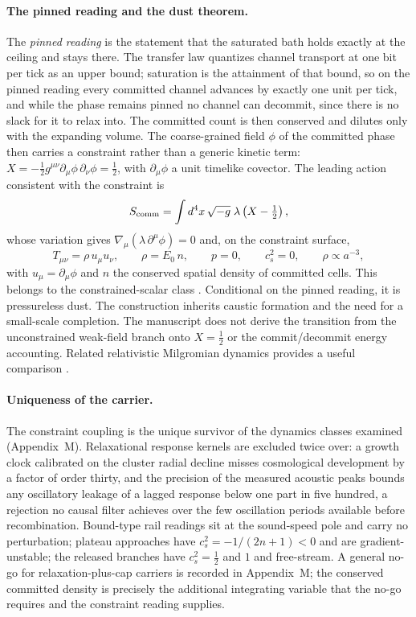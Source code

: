 \documentclass[11pt]{article}
\begin{document}
\paragraph{The pinned reading and the dust theorem.}
The \emph{pinned reading} is the statement that the saturated bath holds exactly at the ceiling and stays there. The transfer law quantizes channel transport at one bit per tick as an upper bound; saturation is the attainment of that bound, so on the pinned reading every committed channel advances by exactly one unit per tick, and while the phase remains pinned no channel can decommit, since there is no slack for it to relax into. The committed count is then conserved and dilutes only with the expanding volume. The coarse-grained field $\phi$ of the committed phase then carries a constraint rather than a generic kinetic term: $X=-\tfrac12 g^{\mu\nu}\partial_\mu\phi\,\partial_\nu\phi=\tfrac12$, with $\partial_\mu\phi$ a unit timelike covector. The leading action consistent with the constraint is
\[
S_{\rm comm}=\int d^4x\,\sqrt{-g}\;\lambda\left(X-\tfrac12\right),
\]
whose variation gives $\nabla_\mu(\lambda\,\partial^\mu\phi)=0$ and, on the constraint surface,
\[
T_{\mu\nu}=\rho\,u_\mu u_\nu,\qquad \rho=E_0\,n,\qquad p=0,\qquad c_s^2=0,\qquad \rho\propto a^{-3},
\]
with $u_\mu=\partial_\mu\phi$ and $n$ the conserved spatial density of committed cells. This belongs to the constrained-scalar class \citep{ChamseddineMukhanov2013}. Conditional on the pinned reading, it is pressureless dust. The construction inherits caustic formation and the need for a small-scale completion. The manuscript does not derive the transition from the unconstrained weak-field branch onto $X=\tfrac12$ or the commit/decommit energy accounting. Related relativistic Milgromian dynamics provides a useful comparison \citep{Skordis2021}.

\paragraph{Uniqueness of the carrier.}
The constraint coupling is the unique survivor of the dynamics classes examined (Appendix~M). Relaxational response kernels are excluded twice over: a growth clock calibrated on the cluster radial decline misses cosmological development by a factor of order thirty, and the precision of the measured acoustic peaks bounds any oscillatory leakage of a lagged response below one part in five hundred, a rejection no causal filter achieves over the few oscillation periods available before recombination. Bound-type rail readings sit at the sound-speed pole and carry no perturbation; plateau approaches have $c_s^2=-1/(2n{+}1)<0$ and are gradient-unstable; the released branches have $c_s^2=\tfrac12$ and $1$ and free-stream. A general no-go for relaxation-plus-cap carriers is recorded in Appendix~M; the conserved committed density is precisely the additional integrating variable that the no-go requires and the constraint reading supplies.
\end{document}
